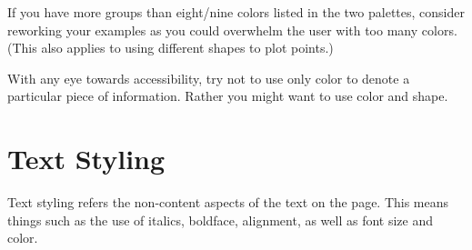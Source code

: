 \documentclass[
]{book}
\newenvironment{Shaded}{\begin{snugshade}}{\end{snugshade}}
\newcommand{\CommentTok}[1]{\textcolor[rgb]{0.56,0.35,0.01}{\textit{#1}}}
\newcommand{\DataTypeTok}[1]{\textcolor[rgb]{0.13,0.29,0.53}{#1}}
\newcommand{\KeywordTok}[1]{\textcolor[rgb]{0.13,0.29,0.53}{\textbf{#1}}}
\newcommand{\NormalTok}[1]{#1}
\newcommand{\OperatorTok}[1]{\textcolor[rgb]{0.81,0.36,0.00}{\textbf{#1}}}
\newcommand{\StringTok}[1]{\textcolor[rgb]{0.31,0.60,0.02}{#1}}
\begin{document}
\begin{Shaded}
\end{Shaded}

If you have more groups than eight/nine colors listed in the two palettes, consider reworking your examples as you could overwhelm the user with too many colors. (This also applies to using different shapes to plot points.)

With any eye towards accessibility, try not to use only color to denote a particular piece of information. Rather you might want to use color and shape.

\hypertarget{styleText}{%
\section{Text Styling}\label{styleText}}

Text styling refers the non-content aspects of the text on the page. This means things such as the use of italics, boldface, alignment, as well as font size and color.
\end{document}
